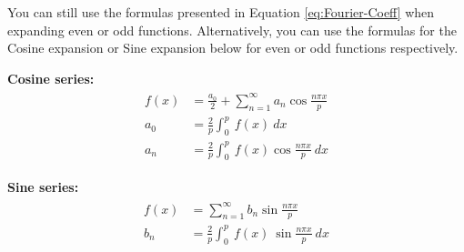 You can still use the formulas presented in Equation \ref{eq:Fourier-Coeff} when expanding even or odd functions.  Alternatively, you can use the formulas for the Cosine expansion or Sine expansion below for even or odd functions respectively.

\vspace{0.5cm}

\noindent\textbf{Cosine series:}
\begin{align}
\begin{split}
f(x) &= \frac{a_0}{2} + \sum\limits_{n=1}^{\infty}a_n \cos{\frac{n \pi x}{p}} \\
a_0 &= \frac{2}{p}\int_0^p \ f(x) \ dx \\
a_n &= \frac{2}{p} \int_0^p \ f(x) \cos{\frac{n \pi x}{p}} \ dx
\end{split}
\end{align}

\vspace{0.5cm}

\noindent\textbf{Sine series:}
\begin{align}
\begin{split}
f(x) &= \sum\limits_{n=1}^{\infty} b_n \sin{\frac{n \pi x}{p}} \\
b_n &= \frac{2}{p}\int_{0}^{p} \ f(x) \ \sin{\frac{n \pi x}{p}} \ dx
\end{split}
\end{align}

